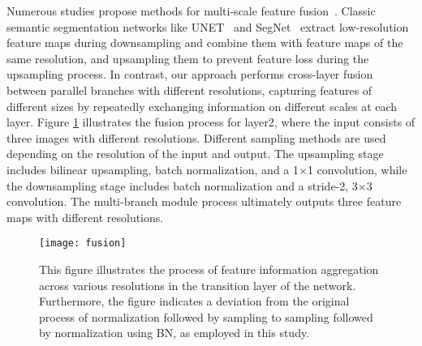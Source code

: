 \documentclass[journal]{IEEEtran}
\begin{document}
Numerous studies propose methods for multi-scale feature fusion~\cite{long2015fully,cheng2020higherhrnet,zhang2019multi}. Classic semantic segmentation networks like UNET~\cite{ronneberger2015u} and SegNet~\cite{badrinarayanan2017segnet} extract low-resolution feature maps during downsampling and combine them with feature maps of the same resolution, and upsampling them to prevent feature loss during the upsampling process. In contrast, our approach performs cross-layer fusion between parallel branches with different resolutions, capturing features of different sizes by repeatedly exchanging information on different scales at each layer. Figure \ref{fig:fusion} illustrates the fusion process for layer2, where the input consists of three images with different resolutions. Different sampling methods are used depending on the resolution of the input and output. The upsampling stage includes bilinear upsampling, batch normalization, and a 1$\times$1 convolution, while the downsampling stage includes batch normalization and a stride-2, 3$\times$3 convolution. The multi-branch module  process ultimately outputs three feature maps with different resolutions.


\begin{figure}[!ht]
    \centering
    \texttt{[image: fusion]}
    \caption{This figure illustrates the process of feature information aggregation across various resolutions in the transition layer of the network. Furthermore, the figure indicates a deviation from the original process of normalization followed by sampling to sampling followed by normalization using BN, as employed in this study.}
    \label{fig:fusion}
\end{figure}
\end{document}
